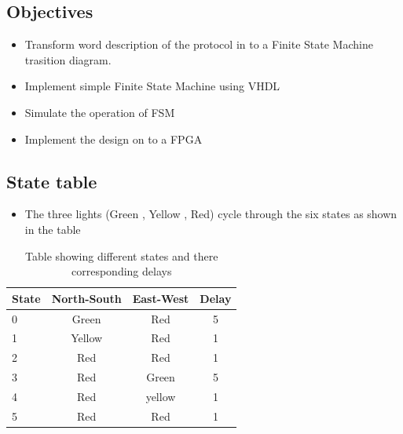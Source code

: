 \documentclass[11pt, a4paper]{article} %
\begin{document}
\subsection{Objectives} %
  \begin{itemize}
  \item {Transform word description of the protocol in to a Finite State Machine trasition diagram. }
  \item {Implement simple Finite State Machine using VHDL}
  \item{Simulate the operation of FSM}
  \item{Implement the design on to a FPGA}
  \end{itemize}
  
  
\subsection{State table}
\begin{itemize}
    \item The three lights (Green , Yellow , Red) cycle through the six states as shown in the table 
\end{itemize}

    \begin{table}
    \begin{tabular}{l | c | c | c }
    State & North-South & East-West & Delay \\
    \hline \hline
    0 & Green & Red & 5 \\ 
    1 & Yellow & Red & 1 \\
    2 & Red & Red & 1 \\
    3 & Red & Green & 5 \\ 
    4 & Red & yellow & 1\\
    5 & Red & Red & 1
    \end{tabular}
    \caption{Table showing different states and there corresponding delays}
    \end{table}
\end{document}
